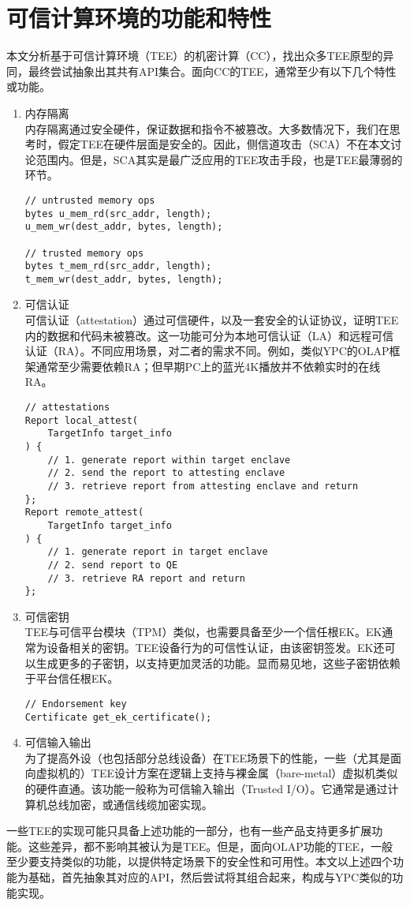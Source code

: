 \chapter{可信计算环境的功能和特性}

本文分析基于可信计算环境（TEE）的机密计算（CC），找出众多TEE原型的异同，最终尝试抽象出其共有API集合。面向CC的TEE，通常至少有以下几个特性或功能。

\begin{enumerate}
    \item 内存隔离\\
    内存隔离通过安全硬件，保证数据和指令不被篡改。大多数情况下，我们在思考时，假定TEE在硬件层面是安全的。因此，侧信道攻击（SCA）不在本文讨论范围内。但是，SCA其实是最广泛应用的TEE攻击手段，也是TEE最薄弱的环节。

    \begin{lstlisting}
// untrusted memory ops 
bytes u_mem_rd(src_addr, length); 
u_mem_wr(dest_addr, bytes, length); 
        
// trusted memory ops
bytes t_mem_rd(src_addr, length);
t_mem_wr(dest_addr, bytes, length);         
    \end{lstlisting}

    \item 可信认证\\
    可信认证（attestation）通过可信硬件，以及一套安全的认证协议，证明TEE内的数据和代码未被篡改。这一功能可分为本地可信认证（LA）和远程可信认证（RA）。不同应用场景，对二者的需求不同。例如，类似YPC的OLAP框架通常至少需要依赖RA；但早期PC上的蓝光4K播放并不依赖实时的在线RA。

    \begin{lstlisting}
// attestations 
Report local_attest(
    TargetInfo target_info
) {
    // 1. generate report within target enclave
    // 2. send the report to attesting enclave
    // 3. retrieve report from attesting enclave and return 
}; 
Report remote_attest(
    TargetInfo target_info
) {
    // 1. generate report in target enclave
    // 2. send report to QE
    // 3. retrieve RA report and return
};   
    \end{lstlisting}

    \item 可信密钥\\
    TEE与可信平台模块（TPM）类似，也需要具备至少一个信任根EK。EK通常为设备相关的密钥。TEE设备行为的可信性认证，由该密钥签发。EK还可以生成更多的子密钥，以支持更加灵活的功能。显而易见地，这些子密钥依赖于平台信任根EK。

    \begin{lstlisting}
// Endorsement key 
Certificate get_ek_certificate(); 
    \end{lstlisting}

    \item 可信输入输出\\
    为了提高外设（也包括部分总线设备）在TEE场景下的性能，一些（尤其是面向虚拟机的）TEE设计方案在逻辑上支持与裸金属（bare-metal）虚拟机类似的硬件直通。该功能一般称为可信输入输出（Trusted I/O）。它通常是通过计算机总线加密，或通信线缆加密实现。
\end{enumerate}

一些TEE的实现可能只具备上述功能的一部分，也有一些产品支持更多扩展功能。这些差异，都不影响其被认为是TEE。但是，面向OLAP功能的TEE，一般至少要支持类似的功能，以提供特定场景下的安全性和可用性。本文以上述四个功能为基础，首先抽象其对应的API，然后尝试将其组合起来，构成与YPC类似的功能实现。
